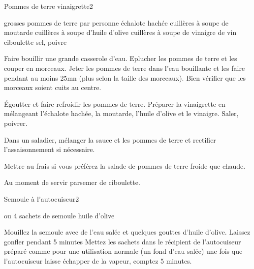 \begin{recette}{Pommes de terre vinaigrette}{2}{}{}
\begin{ingredients}
 grosses pommes de terre par personne
 échalote hachée
 cuillères à soupe de moutarde
 cuillères à soupe d'huile d'olive
 cuillères à soupe de vinaigre de vin
\ingredient ciboulette
\ingredient sel, poivre
\end{ingredients}

\begin{preparation}
\etape Faire bouillir une grande casserole d'eau. Eplucher les pommes de terre et les couper en morceaux. Jeter les pommes de terre dans l'eau bouillante et les faire pendant au moins 25mn (plus selon la taille des morceaux). Bien vérifier que les morceaux soient cuits au centre.

\etape Égoutter et faire refroidir les pommes de terre. Préparer la vinaigrette en mélangeant l'échalote hachée, la moutarde, l'huile d'olive et le vinaigre. Saler, poivrer.

\etape Dans un saladier, mélanger la sauce et les pommes de terre et rectifier l'assaisonnement si nécessaire.

\begin{remarque}
Mettre au frais si vous préférez la salade de pommes de terre froide que chaude.
\end{remarque}

\etape Au moment de servir parsemer de ciboulette.
\end{preparation}
\end{recette}

\begin{recette}{Semoule à l'autocuiseur}{2}{}{}
\begin{ingredients}
 ou 4 sachets de semoule
\ingredient huile d'olive
\end{ingredients}

\begin{preparation}
\etape Mouillez la semoule avec de l'eau salée et quelques gouttes d'huile d'olive. Laissez gonfler pendant 5 minutes
\etape Mettez les sachets dans le récipient de l'autocuiseur préparé comme pour une utilisation normale (un fond d'eau salée)
\etape une fois que l'autocuiseur laisse échapper de la vapeur, comptez 5 minutes. 
\end{preparation}
\end{recette}
